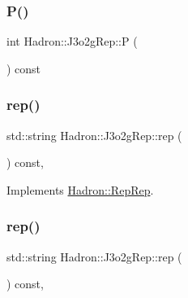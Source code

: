 \mbox{\label{structHadron_1_1J3o2gRep_a52046d4b4dfe6708dfd95c7477fa09ae}} 
\subsubsection{\texorpdfstring{P()}{P()}\hspace{0.1cm}{\footnotesize\ttfamily [2/2]}}
{\footnotesize\ttfamily int Hadron\+::\+J3o2g\+Rep\+::P (\begin{DoxyParamCaption}{ }\end{DoxyParamCaption}) const\hspace{0.3cm}{\ttfamily [inline]}}

\mbox{\label{structHadron_1_1J3o2gRep_a17dda74a4f77bec727e5d13b21917c8f}} 
\subsubsection{\texorpdfstring{rep()}{rep()}\hspace{0.1cm}{\footnotesize\ttfamily [1/2]}}
{\footnotesize\ttfamily std\+::string Hadron\+::\+J3o2g\+Rep\+::rep (\begin{DoxyParamCaption}{ }\end{DoxyParamCaption}) const\hspace{0.3cm}{\ttfamily [inline]}, {\ttfamily [virtual]}}



Implements \mbox{\hyperlink{structHadron_1_1RepRep_ab3213025f6de249f7095892109575fde}{Hadron\+::\+Rep\+Rep}}.

\mbox{\label{structHadron_1_1J3o2gRep_a17dda74a4f77bec727e5d13b21917c8f}} 
\subsubsection{\texorpdfstring{rep()}{rep()}\hspace{0.1cm}{\footnotesize\ttfamily [2/2]}}
{\footnotesize\ttfamily std\+::string Hadron\+::\+J3o2g\+Rep\+::rep (\begin{DoxyParamCaption}{ }\end{DoxyParamCaption}) const\hspace{0.3cm}{\ttfamily [inline]}, {\ttfamily [virtual]}}




